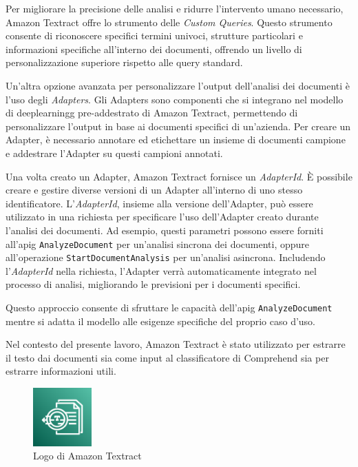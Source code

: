 Per migliorare la precisione delle analisi e ridurre l'intervento umano necessario, Amazon Textract offre lo strumento delle \textit{Custom Queries}. Questo strumento consente di riconoscere specifici termini univoci, strutture particolari e informazioni specifiche all'interno dei documenti, offrendo un livello di personalizzazione superiore rispetto alle query standard.

Un'altra opzione avanzata per personalizzare l'output dell'analisi dei documenti è l'uso degli \textit{Adapters}. Gli Adapters sono componenti che si integrano nel modello di \gls{deeplearningg} pre-addestrato di Amazon Textract, permettendo di personalizzare l'output in base ai documenti specifici di un'azienda. Per creare un Adapter, è necessario annotare ed etichettare un insieme di documenti campione e addestrare l'Adapter su questi campioni annotati.

Una volta creato un Adapter, Amazon Textract fornisce un \textit{AdapterId}. È possibile creare e gestire diverse versioni di un Adapter all'interno di uno stesso identificatore. L'\textit{AdapterId}, insieme alla versione dell'Adapter, può essere utilizzato in una richiesta per specificare l'uso dell'Adapter creato durante l'analisi dei documenti. Ad esempio, questi parametri possono essere forniti all'\gls{apig} \texttt{AnalyzeDocument} per un'analisi sincrona dei documenti, oppure all'operazione \texttt{StartDocumentAnalysis} per un'analisi asincrona. Includendo l'\textit{AdapterId} nella richiesta, l'Adapter verrà automaticamente integrato nel processo di analisi, migliorando le previsioni per i documenti specifici.

Questo approccio consente di sfruttare le capacità dell'\gls{apig} \texttt{AnalyzeDocument} mentre si adatta il modello alle esigenze specifiche del proprio caso d'uso. 

Nel contesto del presente lavoro, Amazon Textract è stato utilizzato per estrarre il testo dai documenti sia come input al classificatore di Comprehend sia per estrarre informazioni utili.

\begin{figure}[h]
  \centering
  \includegraphics[width=0.2\textwidth]{img/tecnologie/textract.png}
  \caption{Logo di Amazon Textract}
  \label{fig:textract}
\end{figure}

